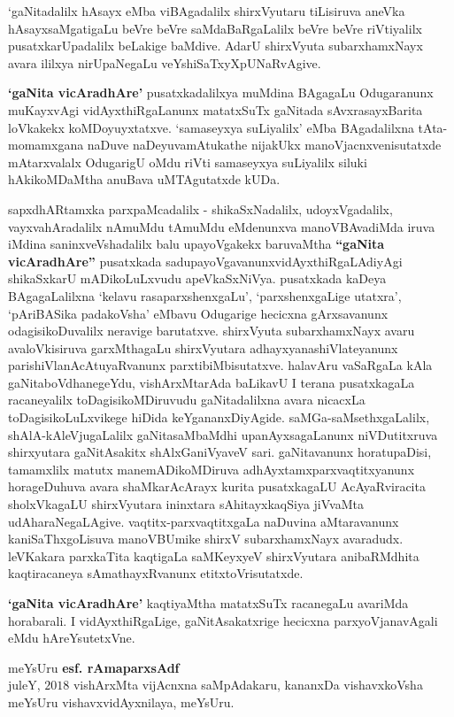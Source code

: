 \bigskip

`gaNitadalilx hAsayx eMba viBAgadalilx shirxVyutaru tiLisiruva aneVka hAsayxsaMgatigaLu beVre beVre saMdaBaRgaLalilx beVre beVre riVtiyalilx pusatxkarUpadalilx beLakige baMdive. AdarU shirxVyuta subarxhamxNayx avara ililxya nirUpaNegaLu veYshiSaTxyXpUNaRvAgive.

\bigskip

{\bf `gaNita vicAradhAre'} pusatxkadalilxya muMdina BAgagaLu Odugaranunx muKayxvAgi vidAyxthiRgaLanunx matatxSuTx gaNitada sAvxrasayxBarita loVkakekx koMDoyuyxtatxve. `samaseyxya suLiyalilx' eMba BAgadalilxna tAta-momamxgana naDuve naDeyuva\break mAtukathe nijakUkx manoVjacnxvenisutatxde mAtarxvalalx OdugarigU oMdu riVti samaseyx\-ya suLiyalilx siluki hAkikoMDaMtha anuBava uMTAgutatxde kUDa.

\bigskip

sapxdhARtamxka parxpaMcadalilx - shikaSxNadalilx, udoyxVgadalilx, vayxvahAradalilx nAmuMdu tAmuMdu eMdenunxva manoVBAvadiMda iruva iMdina saninxveVshadalilx balu upayoVgakekx baruvaMtha {\bf ``gaNita vicAradhAre''} pusatxkada sadupayoVgavanunx\break vidAyxthiRgaLAdiyAgi shikaSxkarU mADikoLuLxvudu apeVkaSxNiVya. pusatxkada kaDeya BAgagaLalilxna `kelavu rasaparxshenxgaLu', `parxshenxgaLige utatxra', `pAriBASika padakoVsha' eMbavu Odugarige hecicxna gArxsavanunx odagisikoDuvalilx neravige barutatxve. shirxVyuta subarxhamxNayx avaru avaloVkisiruva garxMthagaLu shirxVyutara adhayxyanashiVlateyanunx parishiVlanAcAtuyaRvanunx parxtibiMbisutatxve. halavAru vaSaRgaLa kAla gaNita\-boVdhanegeYdu, vishArxMtarAda baLikavU I terana pusatxkagaLa racaneyalilx toDagisi\-koMDiruvudu gaNitadalilxna avara nicacxLa toDagisikoLuLxvikege hiDida keYgananxDi\break yAgide. saMGa-saMsethxgaLalilx, shAlA-kAleVjugaLalilx gaNitasaMbaMdhi upanAyxsa\break gaLanunx niVDutitxruva shirxyutara gaNitAsakitx shAlxGaniVyaveV sari. gaNitavanunx horatu\-paDisi, tamamxlilx matutx manemADikoMDiruva adhAyxtamxparxvaqtitxyanunx horageDuhuva avara shaMkarAcArayx kurita pusatxkagaLU AcAyaRviracita sholxVkagaLU shirxVyutara ininxtara sAhitayxkaqSiya jiVvaMta udAharaNegaLAgive. vaqtitx-parxvaqtitxgaLa naDuvina aMtaravanunx kaniSaThxgoLisuva manoVBUmike shirxV subarxhamxNayx avaradudx. leVKakara parxkaTita kaqtigaLa saMKeyxyeV shirxVyutara anibaRMdhita kaqtiracaneya sAmathayxRvanunx etitxtoVrisutatxde.

\bigskip

{\bf `gaNita vicAradhAre'} kaqtiyaMtha matatxSuTx racanegaLu avariMda horabarali. I vidAyxthiRgaLige, gaNitAsakatxrige hecicxna parxyoVjanavAgali eMdu hAreYsutetxVne.

\bigskip

\begin{flushright}
meYsUru \hfill{\bf esf. rAmaparxsAdf}\hfill\\
juleY, $2018$ \hfill{vishArxMta vijAcnxna saMpAdakaru, kananxDa vishavxkoVsha}\\
\hfill{meYsUru vishavxvidAyxnilaya, meYsUru.}\\
\end{flushright}
